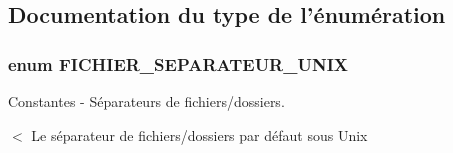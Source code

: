 \subsection{Documentation du type de l'énumération}
\subsubsection{\setlength{\rightskip}{0pt plus 5cm}enum {\bf FICHIER\_\-SEPARATEUR\_\-UNIX}}\label{_fichier_info_8php_5de8700d1a50e794205a05f9a082607b}


Constantes - Séparateurs de fichiers/dossiers. 

$<$ Le séparateur de fichiers/dossiers par défaut sous Unix 